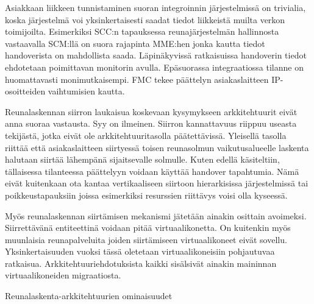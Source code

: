 Asiakkaan liikkeen tunnistaminen suoran integroinnin järjestelmissä on trivialia, koska järjestelmä voi yksinkertaisesti saadat tiedot liikkeistä muilta verkon toimijoilta. Esimerkiksi SCC:n tapauksessa reunajärjestelmän hallinnosta vastaavalla SCM:llä on suora rajapinta MME:hen jonka kautta tiedot handoverista on mahdollista saada. Läpinäkyvissä ratkaisuissa handoverin tiedot ehdotetaan poimittavan monitorin avulla. Epäsuorassa integraatiossa tilanne on huomattavasti monimutkaisempi. FMC tekee päättelyn asiakaslaitteen IP-osoitteiden vaihtumisien kautta. 

Reunalaskennan siirron laukaisua koskevaan kysymykseen arkkitehtuurit eivät anna suoraa vastausta.
Syy on ilmeinen. Siirron kannattavuus riippuu useasta tekijästä, jotka eivät ole arkkitehtuuritasolla päätettävissä. Yleisellä tasolla riittää että asiakaslaitteen siirtyessä toisen reunasolmun vaikutusalueelle laskenta halutaan siirtää lähempänä sijaitsevalle solmulle. Kuten edellä käsiteltiin, tällaisessa tilanteessa päättelyyn voidaan käyttää handover tapahtumia.
Nämä eivät kuitenkaan ota kantaa vertikaaliseen siirtoon hierarkisissa järjestelmissä tai poikkeustapauksiin joissa esimerkiksi resurssien riittävys voisi olla kyseessä.

Myös reunalaskennan siirtämisen mekanismi jätetään ainakin osittain avoimeksi. Siirrettävänä entiteettinä voidaan pitää virtuaalikonetta. On kuitenkin myös muunlaisia reunapalveluita joiden siirtämiseen virtuaalikoneet eivät sovellu. Yksinkertaisuuden vuoksi tässä oletetaan virtuaalikoneisiin pohjautuvaa ratkaisua. 
Arkkitehtuuriehdotuksista kaikki sisälsivät ainakin maininnan virtuaalikoneiden migraatiosta. 

%
%
%
%
%
%


\begin{table}
	\caption{Reunalaskenta-arkkitehtuurien ominaisuudet}
	\label{table:features}
	
\end{table}
 